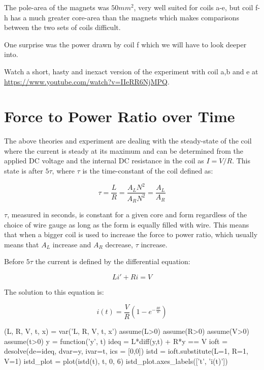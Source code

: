 \documentclass[]{../common/elementary-physics}
\begin{document}
The pole-area of the magnets was $50 mm^2$, very well suited for coils a-e, but coil f-h has a much greater core-area than the magnets which makes comparisons between the two sets of coils difficult.

One surprise was the power drawn by coil f which we will have to look deeper into.

Watch a short, hasty and inexact version of the experiment with coil a,b and e at \url{https://www.youtube.com/watch?v=IIeRR6NjMPQ}.

\section{Force to Power Ratio over Time}

The above theories and experiment are dealing with the steady-state of the coil where the current is steady at its maximum and can be determined from the applied DC voltage and the internal DC resistance in the coil as $I = V/R$. 
This state is after $5 \tau$, where $\tau$ is the time-constant of the coil defined as:

\begin{equation}
\tau = \frac{L}{R} = \frac{A_L N^2}{A_R N^2} = \frac{A_L}{A_R}
\end{equation}

$\tau$, measured in seconds, is constant for a given core and form regardless of the choice of wire gauge as long as the form is equally filled with wire.
This means that when a bigger coil is used to increase the force to power ratio, which usually means that $A_L$ increase and $A_R$ decrease, $\tau$ increase.

Before $5 \tau$ the current is defined by the differential equation:

\begin{equation}
L i' + R i = V
\end{equation}

The solution to this equation is:

\begin{equation}
i(t) = \frac{V}{R} (1 - e^{- \frac{R t}{L}})
\end{equation}

\begin{sagesilent}
(L, R, V, t, x) = var('L, R, V, t, x')
assume(L>0)
assume(R>0)
assume(V>0)
assume(t>0)
y = function('y', t)
ideq = L*diff(y,t) + R*y == V
ioft = desolve(de=ideq, dvar=y, ivar=t, ics = [0,0])
istd = ioft.substitute(L=1, R=1, V=1)
istd_plot = plot(istd(t), t, 0, 6)
istd_plot.axes_labels(['t', 'i(t)'])
\end{sagesilent}
\end{document}
